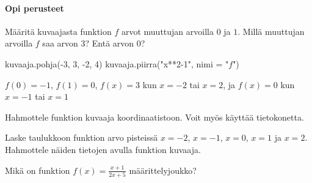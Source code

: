 \begin{tehtavasivu}

\paragraph*{Opi perusteet}
\begin{tehtava}
Määritä kuvaajasta funktion \(f\) arvot muuttujan arvoilla $0$ ja $1$. Millä muuttujan arvoilla \(f\) saa arvon \(3\)? Entä arvon \(0\)?
\begin{kuva}
    kuvaaja.pohja(-3, 3, -2, 4)
    kuvaaja.piirra("x**2-1", nimi = "$f$")
\end{kuva}
\begin{vastaus}
 {$f(0)=-1$, $f(1)=0$, $f(x)=3$ kun $x=-2$ tai $x=2$, ja $f(x)=0$ kun $x=-1$ tai $x=1$}
\end{vastaus}
\end{tehtava}


\begin{tehtava}
Hahmottele funktion kuvaaja koordinaatistoon. Voit myös käyttää tietokonetta.
\begin{alakohdat}
\end{alakohdat}

\end{tehtava}

\begin{tehtava}
  Laske taulukkoon funktion arvo pisteissä $x=-2$, $x=-1$, $x=0$, $x=1$ ja $x=2$. Hahmottele näiden tietojen avulla funktion kuvaaja.
  \begin{alakohdat}
  \end{alakohdat}

  \begin{vastaus}
    \begin{alakohdat}
    \end{alakohdat}
  \end{vastaus}
\end{tehtava}

\begin{tehtava} %
  Mikä on funktion $f(x)=\frac{x+1}{2x+5}$ määrittelyjoukko?


\end{tehtava}
\end{tehtavasivu}
